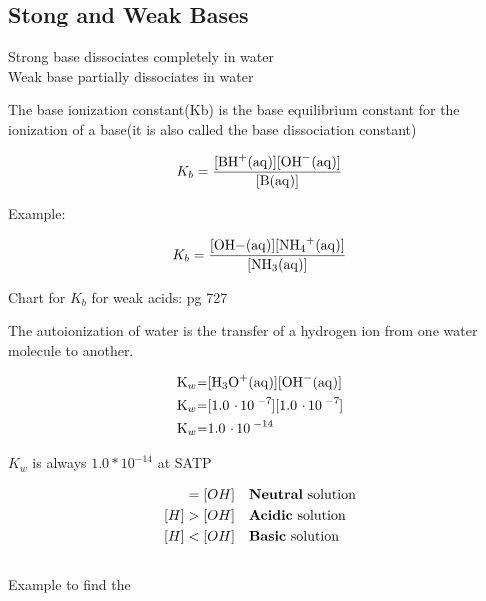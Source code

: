 \documentclass{article}
\begin{document}
\subsection{Stong and Weak Bases}
\begin{center}
Strong base dissociates completely in water\\
Weak base partially dissociates in water\\
\end{center}
The base ionization constant(Kb) is the base equilibrium constant for the ionization of a base(it is also called the base dissociation constant)\\

\begin{center}
  \begin{equation}
    K_b =\ce{\frac{[BH^+(aq)][OH^-(aq)]}{[B(aq)]}}
  \end{equation}
  \end{center}
Example:\\
\begin{center}
\end{center}
\begin{align*}
K_b = \frac{\ce{[OH-(aq)][NH4+(aq)]}}{\ce{[NH3(aq)]}}
\end{align*}

\vspace{4mm}
Chart for $K_b$ for weak acids: pg 727 
\newpage

The autoionization of water is the transfer of a hydrogen ion from one water molecule to another.

\begin{center}
\end{center}
\begin{center}
  \begin{align*}
    \ce{K_w&=[H3O+(aq)][OH^-(aq)]}\\
    \ce{K_w&=[1.0*10^-7][1.0*10^-7]}\\
    \ce{K_w&=1.0*10^-14}
  \end{align*}
\end{center}

\begin{center}
$K_w$ is always $1.0*10^{-14}$ at SATP\\
\end{center}
  
\vspace{1mm}

\begin{align*}
[H] &= [OH] && \text{\textbf  {Neutral} solution}\\
[H] &> [OH] && \text{\textbf {Acidic} solution}\\
[H] &< [OH] && \text{\textbf  {Basic} solution\hspace{3.3mm}}  \\
\end{align*}
\\
Example to find the \ce{[H3O^-(aq)]}
\end{document}
